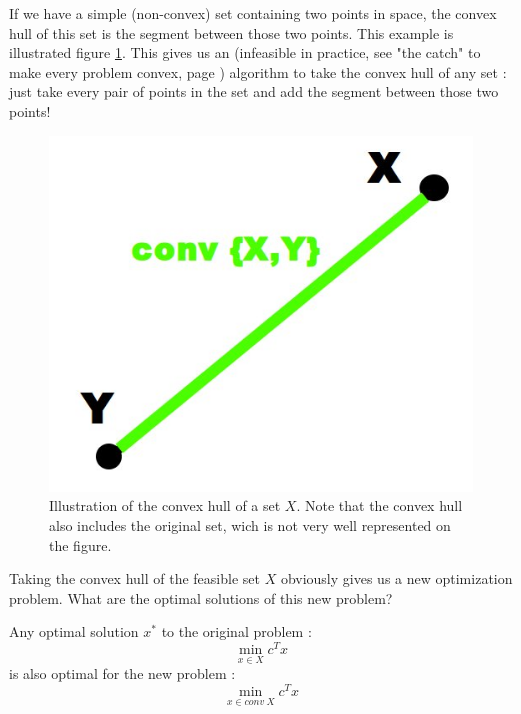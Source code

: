 \begin{example}
\begin{leftbar}
If we have a simple (non-convex) set containing two points in space, the convex hull of this set is the segment between those two points. This example is illustrated figure \ref{conv}. This gives us an (infeasible in practice, see "the catch" to make every problem convex, page \pageref{catch}) algorithm to take the convex hull of any set : just take every pair of points in the set and add the segment between those two points!

\end{leftbar}
\end{example}

\begin{figure}[h!]
\centering
\includegraphics[scale=0.2]{./images/Course2_conv2}
\caption{Illustration of the convex hull of a set $X$. Note that the convex hull also includes the original set, wich is not very well represented on the figure.}
\label{conv}
\end{figure}

Taking the convex hull of the feasible set $X$ obviously gives us a new optimization problem. What are the optimal solutions of this new problem?\\

\begin{theorem}
Any optimal solution $x^*$ to the original problem :
$$\min_{x \in X} c^T x$$
is also optimal for the new problem :
$$\min_{x \in conv \: X} c^T x$$
\end{theorem}


